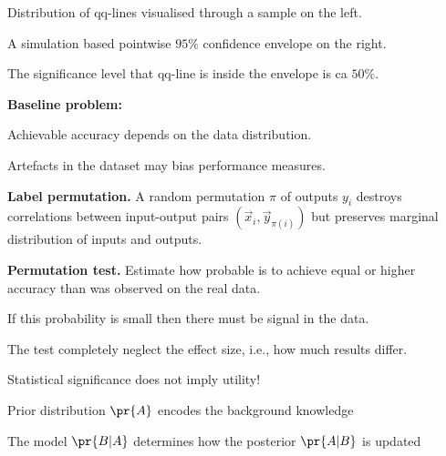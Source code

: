 \documentclass[landscape,footrule]{foils}
\begin{document}
\begin{triangles}
\item Distribution of qq-lines visualised through a sample on the left.
\item A simulation based pointwise $95\%$ confidence envelope on the right.
\item The significance level that qq-line is inside the envelope is ca $50\%$.
\end{triangles}


\textbf{Baseline problem:}
\begin{triangles}
\item Achievable accuracy depends on the data distribution. 
\item Artefacts in the dataset may bias performance measures.
\end{triangles}
\vspace*{2ex}

\textbf{Label permutation.}
A random permutation $\pi$ of outputs $y_i$ destroys correlations between input-output pairs $(\vec{x}_{i}, \vec{y}_{\pi(i)})$ but preserves marginal distribution of inputs and outputs. 
\vspace*{2ex}


\textbf{Permutation test.}
Estimate how probable is to achieve equal or higher accuracy than was observed on the real data.
\begin{triangles}
\item If this probability is small then there must be signal in the data. 
\item The test completely neglect the effect size, i.e., how much results differ.
\item Statistical significance does not imply utility!      
\end{triangles}  





\vspace*{1cm}
\begin{triangles}
\item Prior distribution $\pr{A}$ encodes the background knowledge
\item The model $\pr{B|A}$  determines how the posterior $\pr{A|B}$ is updated 
\end{triangles}
\end{document}
